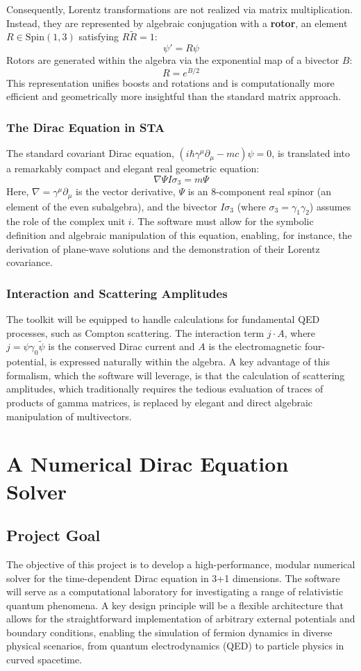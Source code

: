 \documentclass[11pt, letterpaper]{article}
\theoremstyle{definition}
\theoremstyle{remark}
\begin{document}
Consequently, Lorentz transformations are not realized via matrix
multiplication. Instead, they are represented by algebraic conjugation with a
\textbf{rotor}, an element $R \in \mathrm{Spin}(1,3)$ satisfying $R\tilde{R}=1$:
\[
	\psi' = R\psi
\]
Rotors are generated within the algebra via the exponential map of a bivector $B$:
\[
	R = e^{B/2}
\]
This representation unifies boosts and rotations and is computationally more
efficient and geometrically more insightful than the standard matrix approach.

\subsubsection{The Dirac Equation in STA}
The standard covariant Dirac equation, $(i\hbar\gamma^\mu\partial_\mu - mc)\psi
= 0$, is translated into a remarkably compact and elegant real geometric
equation:
\[
	\nabla\Psi I\sigma_3 = m\Psi
\]
Here, $\nabla = \gamma^\mu\partial_\mu$ is the vector derivative, $\Psi$ is an
8-component real spinor (an element of the even subalgebra), and the bivector
$I\sigma_3$ (where $\sigma_3 = \gamma_1\gamma_2$) assumes the role of the
complex unit $i$. The software must allow for the symbolic definition and
algebraic manipulation of this equation, enabling, for instance, the derivation
of plane-wave solutions and the demonstration of their Lorentz covariance.

\subsubsection{Interaction and Scattering Amplitudes}
The toolkit will be equipped to handle calculations for fundamental QED
processes, such as Compton scattering. The interaction term $j \cdot A$, where
$j = \psi\gamma_0\tilde{\psi}$ is the conserved Dirac current and $A$ is the
electromagnetic four-potential, is expressed naturally within the algebra. A key
advantage of this formalism, which the software will leverage, is that the
calculation of scattering amplitudes, which traditionally requires the tedious
evaluation of traces of products of gamma matrices, is replaced by elegant and
direct algebraic manipulation of multivectors.

\section{A Numerical Dirac Equation Solver}

\subsection{Project Goal}
The objective of this project is to develop a high-performance, modular
numerical solver for the time-dependent Dirac equation in 3+1 dimensions. The
software will serve as a computational laboratory for investigating a range of
relativistic quantum phenomena. A key design principle will be a flexible
architecture that allows for the straightforward implementation of arbitrary
external potentials and boundary conditions, enabling the simulation of fermion
dynamics in diverse physical scenarios, from quantum electrodynamics (QED) to
particle physics in curved spacetime.
\end{document}
